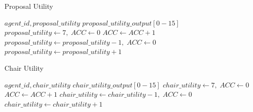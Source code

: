 \begin{algorithm}
\caption{Proposal Utility}\label{alg:2}
\begin{algorithmic} 
\scriptsize
\Require $agent\_id, proposal\_utility$
\Ensure $proposal\_utility\_output[0-15]$
\State $proposal\_utility \leftarrow 7, \; ACC \leftarrow 0$
\EndIf
{}
\State $ACC \leftarrow ACC+1$
\State $proposal\_utility \leftarrow proposal\_utility - 1, \; ACC \leftarrow 0$
\EndIf
\EndIf
{}
\State $proposal\_utility \leftarrow proposal\_utility + 1$
\EndIf
\end{algorithmic}
\end{algorithm}



\begin{algorithm}
\caption{Chair Utility}\label{alg:3}
\begin{algorithmic} 
\scriptsize
\Require $agent\_id, chair\_utility$
\Ensure $chair\_utility\_output[0-15]$
\State $chair\_utility \leftarrow 7, \; ACC \leftarrow 0$
\EndIf
{}
\State $ACC \leftarrow ACC+1$
\State $chair\_utility \leftarrow chair\_utility - 1, \; ACC \leftarrow 0$
\EndIf
\EndIf
{}
\State $chair\_utility \leftarrow chair\_utility + 1$
\EndIf
\EndIf
\end{algorithmic}
\end{algorithm}



